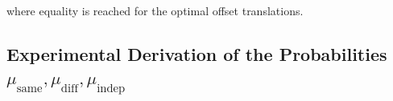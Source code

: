 where equality is reached for the optimal offset translations.

\subsection{Experimental Derivation of the Probabilities \(\mu_{\text{same}}, \mu_{\text{diff}}, \mu_{\text{indep}}\)}










